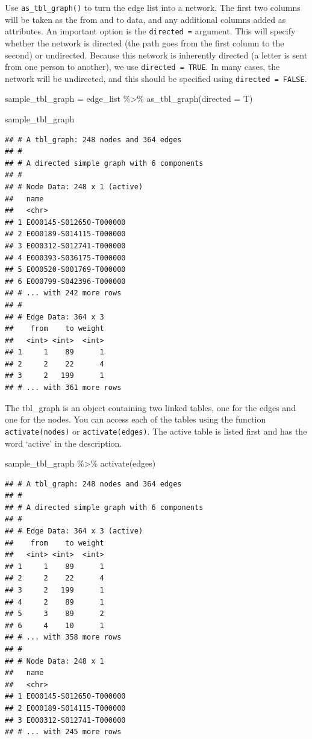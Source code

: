 \documentclass[
]{book}
\newenvironment{Shaded}{\begin{snugshade}}{\end{snugshade}}
\newcommand{\AttributeTok}[1]{\textcolor[rgb]{0.77,0.63,0.00}{#1}}
\newcommand{\FunctionTok}[1]{\textcolor[rgb]{0.00,0.00,0.00}{#1}}
\newcommand{\NormalTok}[1]{#1}
\newcommand{\OtherTok}[1]{\textcolor[rgb]{0.56,0.35,0.01}{#1}}
\newcommand{\SpecialCharTok}[1]{\textcolor[rgb]{0.00,0.00,0.00}{#1}}
\begin{document}
Use \texttt{as\_tbl\_graph()} to turn the edge list into a network. The first two columns will be taken as the from and to data, and any additional columns added as attributes. An important option is the \texttt{directed\ =} argument. This will specify whether the network is directed (the path goes from the first column to the second) or undirected. Because this network is inherently directed (a letter is sent from one person to another), we use \texttt{directed\ =\ TRUE}. In many cases, the network will be undirected, and this should be specified using \texttt{directed\ =\ FALSE}.

\begin{Shaded}
\begin{Highlighting}[]
\NormalTok{sample\_tbl\_graph }\OtherTok{=}\NormalTok{ edge\_list }\SpecialCharTok{\%\textgreater{}\%} 
  \FunctionTok{as\_tbl\_graph}\NormalTok{(}\AttributeTok{directed =}\NormalTok{ T)}

\NormalTok{sample\_tbl\_graph}
\end{Highlighting}
\end{Shaded}

\begin{verbatim}
## # A tbl_graph: 248 nodes and 364 edges
## #
## # A directed simple graph with 6 components
## #
## # Node Data: 248 x 1 (active)
##   name                   
##   <chr>                  
## 1 E000145-S012650-T000000
## 2 E000189-S014115-T000000
## 3 E000312-S012741-T000000
## 4 E000393-S036175-T000000
## 5 E000520-S001769-T000000
## 6 E000799-S042396-T000000
## # ... with 242 more rows
## #
## # Edge Data: 364 x 3
##    from    to weight
##   <int> <int>  <int>
## 1     1    89      1
## 2     2    22      4
## 3     2   199      1
## # ... with 361 more rows
\end{verbatim}

The tbl\_graph is an object containing two linked tables, one for the edges and one for the nodes. You can access each of the tables using the function \texttt{activate(nodes)} or \texttt{activate(edges)}. The active table is listed first and has the word `active' in the description.

\begin{Shaded}
\begin{Highlighting}[]
\NormalTok{sample\_tbl\_graph }\SpecialCharTok{\%\textgreater{}\%} 
  \FunctionTok{activate}\NormalTok{(edges)}
\end{Highlighting}
\end{Shaded}

\begin{verbatim}
## # A tbl_graph: 248 nodes and 364 edges
## #
## # A directed simple graph with 6 components
## #
## # Edge Data: 364 x 3 (active)
##    from    to weight
##   <int> <int>  <int>
## 1     1    89      1
## 2     2    22      4
## 3     2   199      1
## 4     2    89      1
## 5     3    89      2
## 6     4    10      1
## # ... with 358 more rows
## #
## # Node Data: 248 x 1
##   name                   
##   <chr>                  
## 1 E000145-S012650-T000000
## 2 E000189-S014115-T000000
## 3 E000312-S012741-T000000
## # ... with 245 more rows
\end{verbatim}
\end{document}
